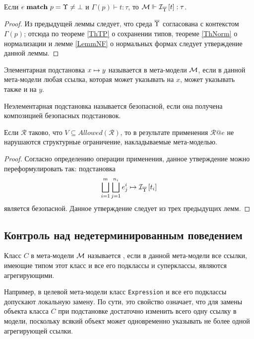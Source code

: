 \begin{Lemm}
Если $e \; \mathbf{match}_{} \; p = \Upsilon \neq \bot$ и $\Gamma(p) \vdash t : \tau$, то $\mathcal{M} \Vdash \mathcal{I}_{\overline{\Upsilon}} \left[ t \right] : \tau$.
\end{Lemm}
\begin{proof}
Из предыдущей леммы следует, что среда $\overline{\Upsilon}$ согласована с контекстом $\Gamma(p)$; отсюда по теореме \ref{ThTP} о сохранении типов, теореме \ref{ThNorm} о нормализации и лемме \ref{LemmNF} о нормальных формах следует утверждение данной леммы.
\end{proof}

\begin{Def}
Элементарная подстановка $x \mapsto y$ называется  в мета-модели $\mathcal{M}$, если в данной мета-модели любая ссылка, которая может указывать на $x$, может указывать также и на $y$.

Неэлементарная подстановка называется безопасной, если она получена композицией безопасных подстановок.
\end{Def}

\begin{Th}
Если $\mathcal{R}$ таково, что $V \subseteq Allowed(\mathcal{R})$, то в результате применения $\mathcal{R}@e$ не нарушаются структурные ограничение, накладываемые мета-моделью.
\end{Th}
\begin{proof}
Согласно определению операции применения, данное утверждение можно переформулировать так: подстановка
$$
\bigsqcup\limits_{i=1}^{m} \bigsqcup\limits_{j=1}^{n_i}
			e^i_j \mapsto \mathcal{I}_{\overline{\Upsilon}} \left[ t_i \right]
$$
является безопасной. Данное утверждение следует из трех предыдущих лемм.
\end{proof}

\subsection{Контроль над недетерминированным поведением}

\begin{Def}
Класс $C$ в мета-модели $\mathcal{M}$ называется , если в данной мета-модели все ссылки, имеющие типом этот класс и все его подклассы и суперклассы, являются агрегирующими.
\end{Def}
Например, в целевой мета-модели  класс \texttt{Expression} и все его подклассы допускают локальную замену. По сути, это свойство означает, что для замены объекта класса $C$ при подстановке достаточно изменить всего одну ссылку в модели, поскольку всякий объект может одновременно указывать не более одной агрегирующей ссылки.

